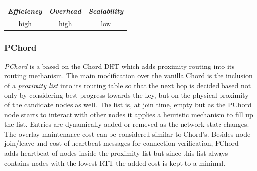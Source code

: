 %
%
%


\begin{center}
\begin{tabular}{ccc}
\emph{Efficiency} & \emph{Overhead} & \emph{Scalability} \\
\hline
high &
high &
low
\end{tabular}
\end{center}

\subsubsection{PChord}
\emph{PChord}\cite{HLYW2005} is a based on the Chord DHT which adds
proximity routing into its routing mechanism. The main modification over the
vanilla Chord is the inclusion of a \emph{proximity list} into its routing table
so that the next hop is decided based not only by considering best progress
towards the key, but on the physical proximity of the candidate nodes as well.
The list is, at join time, empty but as the PChord node starts to interact with
other nodes it applies a heuristic mechanism to fill up the list. Entries are
dynamically added or removed as the network state changes. The overlay
maintenance cost can be considered similar to Chord's. Besides node join/leave
and cost of heartbeat messages for connection verification, PChord adds
heartbeat of nodes inside the proximity list but since this list always contains
nodes with the lowest RTT the added cost is kept to a minimal.

